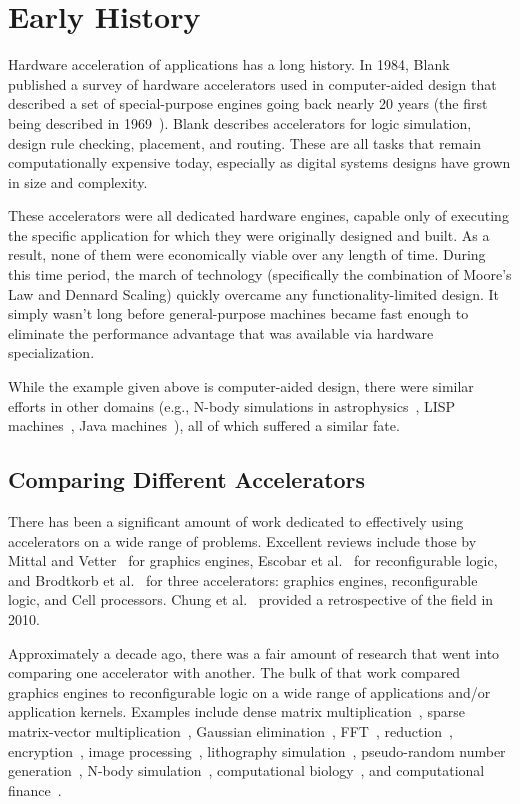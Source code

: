 \section{Early History}
\label{sec:history}

Hardware acceleration of applications has a long history.
In 1984, Blank~\cite{Blank84}
published a survey of hardware accelerators used in computer-aided design 
that described a set of special-purpose engines going back nearly 20 years
(the first being described in 1969~\cite{McKay69}).
Blank describes accelerators for logic simulation, design rule checking,
placement, and routing. These are all tasks that remain computationally
expensive today, especially as digital systems designs have grown in size
and complexity.

These accelerators were all dedicated hardware engines, capable only
of executing the specific application for which they were originally designed
and built. As a result, none of them were economically viable over any
length of time.  During this time period, the march of technology (specifically
the combination of Moore's Law and Dennard Scaling) quickly
overcame any functionality-limited design.  It simply wasn't long
before general-purpose machines became fast enough to eliminate the
performance advantage that was available via hardware specialization.

While the example given above is computer-aided design, there were similar
efforts in other domains (e.g., N-body simulations in
astrophysics~\cite{grapenature,grape},
LISP machines~\cite{lisp,alphalisp},
Java machines~\cite{java,Schoeberl08}),
all of which suffered a similar fate.

\subsection{Comparing Different Accelerators}

There has been a significant amount of work dedicated to effectively
using accelerators on a wide range of problems.  Excellent reviews
include those by Mittal and Vetter~\cite{mv15} for graphics engines,
Escobar et al.~\cite{ecv16} for reconfigurable logic, and
Brodtkorb et al.~\cite{bdh+10} for three accelerators: graphics engines,
reconfigurable logic, and Cell processors.
Chung et al.~\cite{cmhm10} provided a retrospective of the field in 2010.

Approximately a decade ago, there was a fair amount of research that
went into comparing one accelerator with another.  The bulk of that
work compared graphics engines to reconfigurable logic on a wide range
of applications and/or application kernels.
Examples include dense matrix multiplication~\cite{cmhm10,jpbc10},
sparse matrix-vector multiplication~\cite{sww+10},
Gaussian elimination~\cite{cls+08},
FFT~\cite{cmhm10},
reduction~\cite{jpbc10},
encryption~\cite{cls+08},
image processing~\cite{amy09,bnw+10},
lithography simulation~\cite{cz09},
pseudo-random number generation~\cite{jpbc10,tb09,thl09},
N-body simulation~\cite{jpbc10},
computational biology~\cite{cls+08}, and
computational finance~\cite{cmhm10,tb10}.

